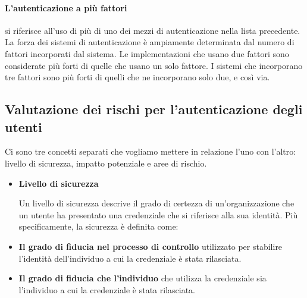 \paragraph{L'autenticazione a più fattori} si riferisce all'uso di più di uno dei mezzi di autenticazione nella lista precedente. La forza dei sistemi di autenticazione è ampiamente determinata dal numero di fattori incorporati dal sistema. Le implementazioni che usano due fattori sono considerate più forti di quelle che usano un solo fattore. I sistemi che incorporano tre fattori sono più forti di quelli che ne incorporano solo due, e così via.

\newpage
\subsection{Valutazione dei rischi per l'autenticazione degli utenti}
Ci sono tre concetti separati che vogliamo mettere in relazione l'uno con l'altro: livello di sicurezza, impatto potenziale e aree di rischio.

\begin{itemize}
    \item \textbf{Livello di sicurezza}

Un livello di sicurezza descrive il grado di certezza di un'organizzazione che un utente ha presentato una credenziale che si riferisce alla sua identità. Più specificamente, la sicurezza è definita come:

    \item \textbf{Il grado di fiducia nel processo di controllo} utilizzato per stabilire l'identità dell'individuo a cui la credenziale è stata rilasciata.
    
    \item \textbf{Il grado di fiducia che l'individuo} che utilizza la credenziale sia l'individuo a cui la credenziale è stata rilasciata.
\end{itemize}
